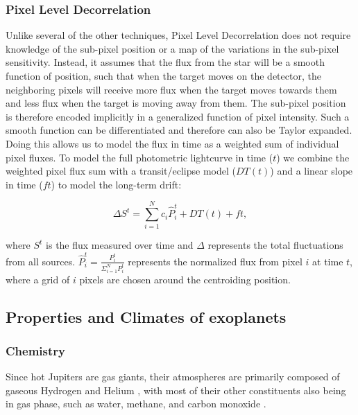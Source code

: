 \subsubsection{Pixel Level Decorrelation}

Unlike several of the other techniques, Pixel Level Decorrelation \citep{Deming2015} does not require knowledge of the sub-pixel position or a map of the variations in the sub-pixel sensitivity. Instead, it assumes that the flux from the star will be a smooth function of position, such that when the target moves on the detector, the neighboring pixels will receive more flux when the target moves towards them and less flux when the target is moving away from them. The sub-pixel position is therefore encoded implicitly in a generalized function of pixel intensity. Such a smooth function can be differentiated and therefore can also be Taylor expanded. Doing this allows us to model the flux in time as a weighted sum of individual pixel fluxes. To model the full photometric lightcurve in time ($t$) we combine the weighted pixel flux sum with a transit/eclipse model ($DT(t)$) and a linear slope in time ($ft$) to model the long-term drift:

\begin{equation}
    \Delta S^t = \sum_{i=1}^{N}c_i \hat{P}_i^t + DT(t) + ft,
\end{equation}

where $S^t$ is the flux measured over time and $\Delta$ represents the total fluctuations from all sources. $\hat{P}_i^t = \frac{P_i^t}{\Sigma_{i=1}^{N}P_i^t}$ represents the normalized flux from pixel $i$ at time $t$, where a grid of $i$ pixels are chosen around the centroiding position.

\subsection{Properties and Climates of exoplanets}%

\subsubsection{Chemistry}

Since hot Jupiters are gas giants, their atmospheres are primarily composed of gaseous Hydrogen and Helium \citep{Seager1999}, with most of their other constituents also being in gas phase, such as water, methane, and carbon monoxide \citep{Brown2001}.

